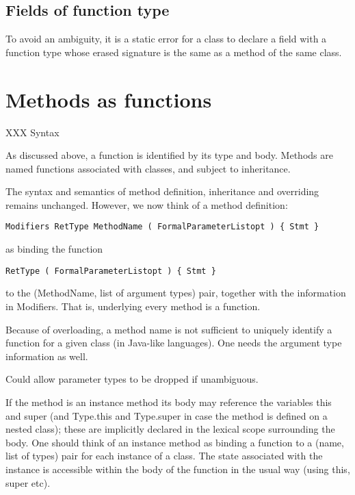 \subsection{Fields of function type}

To avoid an ambiguity, it is a static error for a class to declare a
field with a function type whose erased signature is the same as a
method of the same class.


\section{Methods as functions}


      XXX Syntax


As discussed above, a function is identified by its type and body.
Methods are named functions associated with classes, and subject to
inheritance.

The syntax and semantics of method definition, inheritance and
overriding remains unchanged. However, we now think of a method definition:

\begin{verbatim}
Modifiers RetType MethodName ( FormalParameterListopt ) { Stmt }
\end{verbatim}

as binding the function

\begin{verbatim}
RetType ( FormalParameterListopt ) { Stmt }
\end{verbatim}

to the (MethodName, list of argument types) pair, together with the
information in Modifiers. That is, underlying every method is a function.

\begin{note}
Because of overloading, a method name is not sufficient to
uniquely identify a function for a given class (in Java-like languages).
One needs the argument type information as well.
\end{note}

\begin{note}
Could allow parameter types to be dropped if unambiguous.
\end{note}

If the method is an instance method its body may reference the variables
this and super (and Type.this and Type.super in case the method is
defined on a nested class); these are implicitly declared in the lexical
scope surrounding the body. One should think of an instance method as
binding a function to a (name, list of types) pair for each instance of
a class. The state associated with the instance is accessible within the
body of the function in the usual way (using this, super etc).

